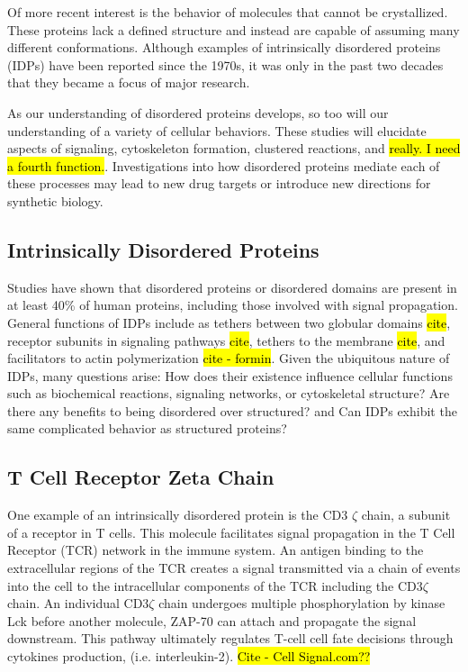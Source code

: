 \documentclass[../AdvancementSummary.tex]{subfiles}
\begin{document}
Of more recent interest is the behavior of molecules that cannot be crystallized. These proteins lack a defined structure and instead are capable of assuming many different conformations. Although examples of intrinsically disordered proteins (IDPs) have been reported since the 1970s, it was only in the past two decades that they became a focus of major research. \cite{Dunker2008} 

As our understanding of disordered proteins develops, so too will our understanding of a variety of cellular behaviors. These studies will elucidate aspects of signaling, cytoskeleton formation, clustered reactions, and \hl{really.  I need a fourth function.}. Investigations into how disordered proteins mediate each of these processes may lead to new drug targets or introduce new directions for synthetic biology.


\subsection{Intrinsically Disordered Proteins}

Studies have shown that disordered proteins or disordered domains are present in at least 40\% of human proteins, including those involved with signal propagation.\cite{Tompa2012} General functions of IDPs include as tethers between two globular domains \hl{cite}, receptor subunits in signaling pathways \hl{cite}, tethers to the membrane \hl{cite}, and facilitators to actin polymerization \hl{cite - formin}. Given the ubiquitous nature of IDPs, many questions arise: How does their existence influence cellular functions such as biochemical reactions, signaling networks, or cytoskeletal structure?  Are there any benefits to being disordered over structured? and Can IDPs exhibit the same complicated behavior as structured proteins?



\subsection{T Cell Receptor Zeta Chain}

One example of an intrinsically disordered protein is the CD3 $\zeta$ chain, a subunit of a receptor in T cells. This molecule facilitates signal propagation in the T Cell Receptor (TCR) network in the immune system.  An antigen binding to the extracellular regions of the TCR creates a signal transmitted via a chain of events into the cell to the intracellular components of the TCR including the CD3$\zeta$ chain.  An individual CD3$\zeta$ chain undergoes multiple phosphorylation by kinase Lck before another molecule, ZAP-70 can attach and propagate the signal downstream. This pathway ultimately regulates T-cell cell fate decisions through cytokines production, (i.e. interleukin-2). \hl{Cite - Cell Signal.com??} 
\end{document}
